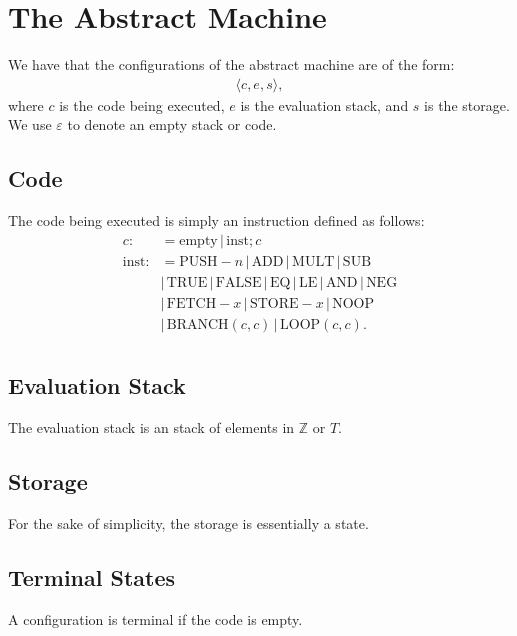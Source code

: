 \section{The Abstract Machine}

We have that the configurations of the abstract machine are of the 
form: \begin{gather*}
  \langle c, e, s \rangle,
\end{gather*} where $c$ is the code being executed, $e$ is the
evaluation stack, and $s$ is the storage. We use $\varepsilon$ to 
denote an empty stack or code.

\subsection{Code}

The code being executed is simply an instruction defined as follows:
\begin{align*}
  c :&= \text{empty} \, | \, \text{inst};c \\
  \text{inst} :&= \text{PUSH}-n \, | \, \text{ADD} \, | \, \text{MULT} \, | \, \text{SUB} \\
  &| \, \text{TRUE} \, | \, \text{FALSE} \, | \, \text{EQ} \, | \, \text{LE} \, | \, \text{AND} \, | \, \text{NEG} \\
  &| \, \text{FETCH}-x \, | \, \text{STORE}-x \, | \, \text{NOOP} \\
  &| \, \text{BRANCH}(c, c) \, | \, \text{LOOP}(c, c). \\
\end{align*}

\subsection{Evaluation Stack}

The evaluation stack is an stack of elements in $\mathbb{Z}$ or $T$.

\subsection{Storage}

For the sake of simplicity, the storage is essentially a state.

\subsection{Terminal States}

A configuration is terminal if the code is empty.

